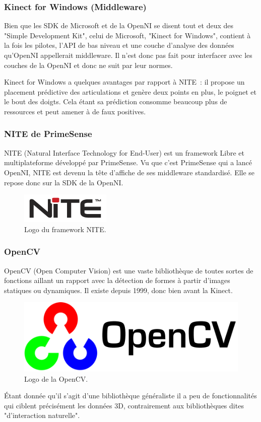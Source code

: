 \documentclass[french,12pt]{report}
\begin{document}
  \subsubsection{Kinect for Windows (Middleware)}  
  Bien que les SDK de Microsoft et de la OpenNI se disent tout et deux des 
  "Simple Development Kit",
  celui de Microsoft, "Kinect for Windows", contient à la fois les pilotes, 
  l'API de bas niveau et une couche d'analyse des données qu'OpenNI appellerait 
  middleware. Il n'est donc pas fait pour interfacer avec les couches de la 
  OpenNI et donc ne suit par leur normes.
  
  Kinect for Windows a quelques avantages par rapport à NITE~: il propose un
  placement prédictive des articulations et genère deux points en plus, 
  le poignet et le bout des doigts. Cela étant sa prédiction consomme beaucoup 
  plus de ressources et peut amener à de faux positives.
  
  \subsubsection{NITE de PrimeSense}
  NITE (Natural Interface Technology for End-User) est un framework Libre et 
  multiplateforme développé par PrimeSense. Vu que c'est PrimeSense qui a 
  lancé OpenNI, NITE est devenu la tête d'affiche de ses
  middleware standardisé. Elle se repose donc sur la SDK de la OpenNI. 
  \begin{figure}[h!]
  \centering
  \includegraphics[width=0.3\linewidth]{images/nite_logo}
  \caption{Logo du framework NITE.}
  \end{figure}
  
  \subsubsection{OpenCV}
  OpenCV (Open Computer Vision) est une vaste bibliothèque de toutes sortes de 
  fonctions aillant un rapport avec la détection de formes à partir d'images
  statiques ou dynamiques. Il existe depuis 1999, donc bien avant la Kinect.
  \begin{figure}[h!]
  \centering
  \includegraphics[width=0.4\linewidth]{images/opencv_logo}
  \caption{Logo de la OpenCV.}
  \end{figure}
  Étant donnée qu'il s'agit d'une bibliothèque généraliste il a peu de 
  fonctionnalités qui ciblent précisément les données 3D, contrairement aux 
  bibliothèques dites "d'interaction naturelle".
  
\end{document}
